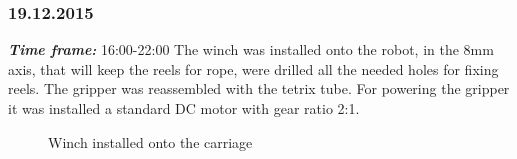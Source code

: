 \subsubsection{19.12.2015}
\textit{\textbf{Time frame:}} 16:00-22:00 \newline
The winch was installed onto the robot, in the 8mm axis, that will keep the reels for rope, were drilled all the needed holes for fixing reels.
The gripper was reassembled with the tetrix tube. For powering the gripper it was installed a standard DC motor with gear ratio 2:1.

\begin{figure}[H]
	\begin{minipage}[h]{0.58\linewidth}
		\caption{Winch installed onto the carriage}
	\end{minipage}
	\hfill
	\begin{minipage}[h]{0.37\linewidth}

\end{minipage}
\end{figure}
